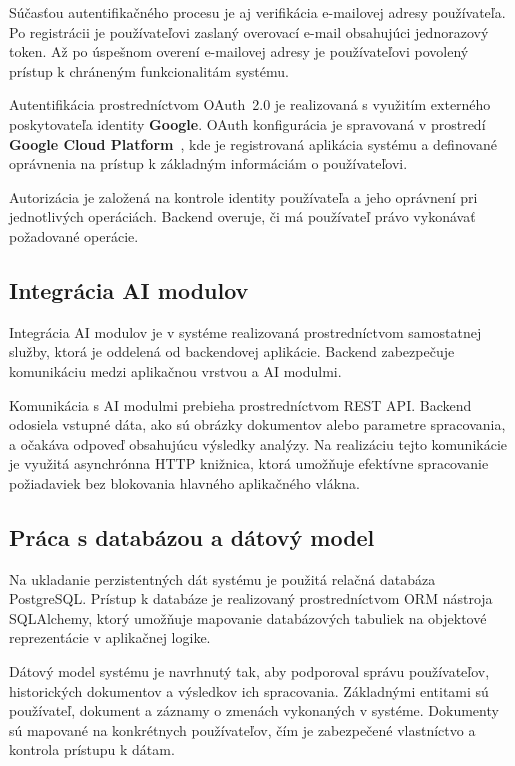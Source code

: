 \documentclass[12pt,a4paper]{article}
\begin{document}
Súčasťou autentifikačného procesu je aj verifikácia e-mailovej adresy
používateľa. Po registrácii je používateľovi zaslaný overovací e-mail
obsahujúci jednorazový token. Až po úspešnom overení e-mailovej adresy
je používateľovi povolený prístup k chráneným funkcionalitám systému.

Autentifikácia prostredníctvom OAuth~2.0 je realizovaná s využitím
externého poskytovateľa identity \textbf{Google}. OAuth konfigurácia
je spravovaná v prostredí \textbf{Google Cloud Platform}~\cite{gcp_oauth},
kde je registrovaná aplikácia systému a definované oprávnenia na prístup
k základným informáciám o používateľovi.

Autorizácia je založená na kontrole identity používateľa a jeho oprávnení
pri jednotlivých operáciách. Backend overuje, či má používateľ právo
vykonávať požadované operácie.

\subsection{Integrácia AI modulov}

Integrácia AI modulov je v systéme realizovaná prostredníctvom samostatnej
služby, ktorá je oddelená od backendovej aplikácie. Backend zabezpečuje komunikáciu medzi
aplikačnou vrstvou a AI modulmi.

Komunikácia s AI modulmi prebieha prostredníctvom REST API. Backend odosiela
vstupné dáta, ako sú obrázky dokumentov alebo parametre spracovania, a
očakáva odpoveď obsahujúcu výsledky analýzy. Na realizáciu tejto komunikácie
je využitá asynchrónna HTTP knižnica, ktorá umožňuje efektívne spracovanie
požiadaviek bez blokovania hlavného aplikačného vlákna.

\subsection{Práca s databázou a dátový model}

Na ukladanie perzistentných dát systému je použitá relačná databáza
PostgreSQL. Prístup k databáze je realizovaný prostredníctvom ORM nástroja
SQLAlchemy, ktorý umožňuje mapovanie databázových tabuliek na objektové
reprezentácie v aplikačnej logike.

Dátový model systému je navrhnutý tak, aby podporoval správu používateľov,
historických dokumentov a výsledkov ich spracovania. Základnými entitami
sú používateľ, dokument a záznamy o zmenách vykonaných v systéme.
Dokumenty sú mapované na konkrétnych používateľov, čím je zabezpečené
vlastníctvo a kontrola prístupu k dátam.
\end{document}
